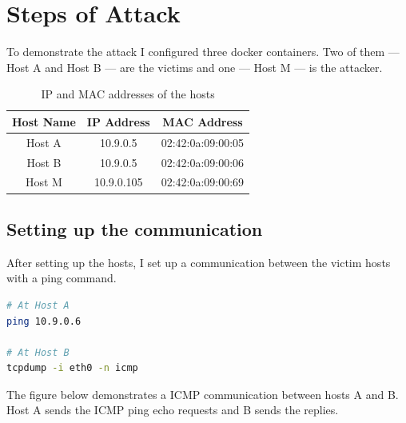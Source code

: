 \documentclass[12pt]{article}
\begin{document}
\FloatBarrier

\vspace{1cm}

\section{Steps of Attack}

To demonstrate the attack I configured three docker containers. Two of them ---
Host A and Host B --- are the victims and one --- Host M --- is the attacker.

\vspace{1cm}

\begin{table}[h!]
    \centering
    \begin{tabular}{ |c|c|c| }
        \hline
        Host Name & IP Address & MAC Address \\
        \hline
        \hline
        Host A & 10.9.0.5 & 02:42:0a:09:00:05 \\
        \hline
        Host B & 10.9.0.5 & 02:42:0a:09:00:06 \\
        \hline
        Host M & 10.9.0.105 & 02:42:0a:09:00:69 \\
        \hline
    \end{tabular}
    \caption{IP and MAC addresses of the hosts}
\end{table}

\vspace{1cm}

\subsection{Setting up the communication}

After setting up the hosts, I set up a communication between the victim hosts
with a ping command.

\vspace{1cm}

\begin{lstlisting}[language=bash,caption={Shell commands},captionpos=b]
# At Host A
ping 10.9.0.6

# At Host B
tcpdump -i eth0 -n icmp
\end{lstlisting}

\vspace{1cm}

The figure below demonstrates a ICMP communication between hosts A and B. Host A
sends the ICMP ping echo requests and B sends the replies.
\end{document}
